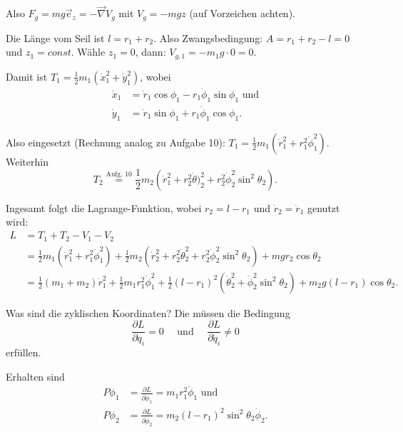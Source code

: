Also $F_g = m g \vec{e}_z = - \vec{\nabla} V_g$ mit $V_g = - m g z$ (auf Vorzeichen achten).

Die Länge vom Seil ist $l = r_1 + r_2$. Also Zwangsbedingung: $A = r_1 + r_2 - l = 0$ und $z_1 = const$. Wähle $z_1 = 0$, dann: $V_{g, 1} = - m_1 g \cdot 0 = 0$.

Damit ist $T_1 = \frac{1}{2} m_1 (\dot{x}_1^2 + \dot{y}_1^2)$, wobei 
\begin{align*}
	\dot{x}_1 &= \dot{r}_1 \cos \phi_1 - r_1 \dot{\phi}_1 \sin \phi_1 \text{ und} \\
	\dot{y}_1 &= \dot{r}_1 \sin \phi_1 + r_1 \dot{\phi}_1 \cos \phi_1 
	\text{.}	
\end{align*}

Also eingesetzt (Rechnung analog zu Aufgabe 10): $T_1 = \frac{1}{2} m_1 \left( \dot{r}_1^2 + r_1^2 \dot{\phi}_1^2 \right)$. Weiterhin 
\[
	T_2 \overset{\text{Aufg. 10}}{=} \frac{1}{2} m_2 \left( \dot{r}_1^2 + r_2^2 \dot{\theta})_2^2 + r_2^2 \dot{\phi}_2^2 \sin^2 \theta_2 \right)
	\text{.}
\]

Ingesamt folgt die Lagrange-Funktion, wobei $r_2 = l - r_1$ und $\dot{r}_2 = \dot{r}_1$ genutzt wird:
\begin{align*}
	L 
	&= T_1 + T_2 - V_1 - V_2 \\
	&= \frac{1}{2} m_1 \left( \dot{r}_1^2 + r_1^2 \dot{\phi}_1^2 \right)
	+ \frac{1}{2} m_2 \left( \dot{r}_2^2 + r_2 ^2 \dot{\theta}_2^2 + r_2^2 \dot{\phi}_2^2 \sin^2 \theta_2 \right)
	+ m g r_2 \cos \theta_2 \\
	&= \frac{1}{2} (m_1 + m_2) \dot{r}_1^2 
	+ \frac{1}{2} m_1 r_1^2 \dot{\phi}_1^2
	+ \frac{1}{2} (l - r_1)^2 (\dot{\theta}_2^2 + \dot{\phi}_2^2 \sin^2 \theta_2)
	+ m_2 g (l - r_1) \cos \theta_2
	\text{.}
\end{align*}

Was sind die zyklischen Koordinaten? Die müssen die Bedingung
\[
	\frac{\partial L}{\partial q_i} = 0 
	\quad \text{ und } \quad 
	\frac{\partial L}{\partial \dot{q}_i} \neq 0
\]
erfüllen.

Erhalten sind 
\begin{align*}
	P \phi_1 &= \frac{\partial L}{\partial \dot{\phi}_1} = m_1 r_1^2 \dot{\phi}_1 \text{ und } \\
	P \phi_2 &= \frac{\partial L}{\partial \dot{\phi}_2} = m_2 (l - r_1)^2 \sin^2 \theta_2 \dot{\phi}_2
	\text{.}
\end{align*}

